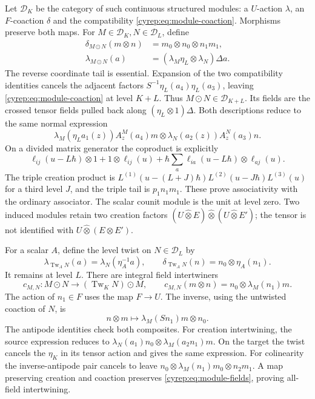 Let \(\mathscr D_K\) be the category of such continuous structured
modules: a \(U\)-action \(\lambda\), an \(F\)-coaction \(\delta\)
and the compatibility \eqref{cyrep:eq:module-coaction}.
Morphisms preserve both maps.
For \(M\in\mathscr D_K,N\in\mathscr D_L\), define
\begin{equation}\label{cyrep:eq:structured-tensor}
\begin{split}
 \delta_{M\odot N}(m\otimes n)
       &=m_0\otimes n_0\otimes n_1m_1,\\
 \lambda_{M\odot N}(a)
       &=(\lambda_M\eta_L\otimes\lambda_N)\Delta a.
\end{split}
\end{equation}
The reverse coordinate tail is essential.
Expansion of the two compatibility identities cancels
the adjacent factors
\(S^{-1}\eta_L(a_4)\eta_L(a_3)\), leaving
\eqref{cyrep:eq:module-coaction} at level \(K+L\).
Thus \(M\odot N\in\mathscr D_{K+L}\).
Its fields are the crossed tensor fields pulled back along
\((\eta_L\otimes1)\Delta\).
Both descriptions reduce to the same normal expression
\[
 \lambda_M(\eta_La_1(z))A^M_z(a_4)m
       \otimes\lambda_N(a_2(z))A^N_z(a_3)n.
\]
On a divided matrix generator the coproduct is explicitly
\[
 \ell_{ij}(u-L\hbar)\otimes1+1\otimes\ell_{ij}(u)
       +\hbar\sum_a\ell_{ia}(u-L\hbar)\otimes\ell_{aj}(u).
\]
The triple creation product is
\(L^{(1)}(u-(L+J)\hbar)L^{(2)}(u-J\hbar)L^{(3)}(u)\)
for a third level \(J\), and the triple tail is \(p_1n_1m_1\).
These prove associativity with the ordinary associator.
The scalar counit module is the unit at level zero.
Two induced modules retain two creation factors
\((U\widehat\otimes E)\widehat\otimes(U\widehat\otimes E')\);
the tensor is not identified with \(U\widehat\otimes(E\otimes E')\).

For a scalar \(A\), define the level twist on \(N\in\mathscr D_L\)
by
\[
 \lambda_{\operatorname{Tw}_A N}(a)=\lambda_N(\eta_A^{-1}a),
 \qquad
 \delta_{\operatorname{Tw}_A N}(n)=n_0\otimes\eta_A(n_1).
\]
It remains at level \(L\).
There are integral field intertwiners
\begin{equation}\label{cyrep:eq:crossed-braiding}
 c_{M,N}:M\odot N\longrightarrow
             (\operatorname{Tw}_K N)\odot M,\qquad
 c_{M,N}(m\otimes n)=n_0\otimes\lambda_M(n_1)m.
\end{equation}
The action of \(n_1\in F\) uses the map \(F\to U\).
The inverse, using the untwisted coaction of \(N\), is
\[
 n\otimes m\longmapsto\lambda_M(Sn_1)m\otimes n_0.
\]
The antipode identities check both composites.
For creation intertwining, the source expression reduces to
\(\lambda_N(a_1)n_0\otimes\lambda_M(a_2n_1)m\).
On the target the twist cancels the \(\eta_K\) in its tensor
action and gives the same expression.
For colinearity the inverse-antipode pair cancels to leave
\(n_0\otimes\lambda_M(n_1)m_0\otimes n_2m_1\).
A map preserving creation and coaction preserves
\eqref{cyrep:eq:module-fields}, proving all-field intertwining.

